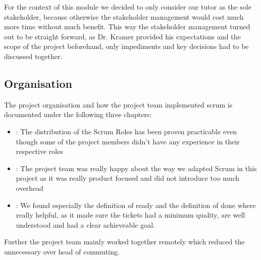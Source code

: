 For the context of this module we decided to only consider our tutor as the sole stakeholder,
because otherwise the stakeholder management would cost much more time without much benefit.
This way the stakeholder management turned out to be straight forward, as Dr. Kramer provided his expectations and the
scope of the project beforehand, only impediments and key decisions had to be discussed together.

\subsection{Organisation}\label{subsec:organisation}
The project organisation and how the project team implemented scrum is documented under the following three chapters:

\begin{itemize}
    \item {}: The distribution of the Scrum Roles has been proven practicable even though some of the project members didn't have any experience in their respective roles
    \item {}: The project team was really happy about the way we adapted Scrum in this project as it was really product focused and did not introduce too much overhead
    \item {}: We found especially the definition of ready and the definition of done where really helpful, as it made sure the tickets had a minimum quality, are well understood and had a clear achieveable goal.
\end{itemize}

Further the project team mainly worked together remotely which reduced the unnecessary over head of commuting.


